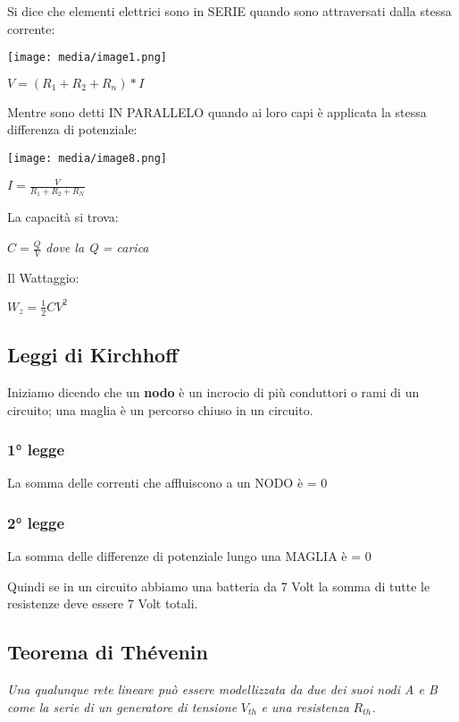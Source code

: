 Si dice che elementi elettrici sono in SERIE quando sono attraversati
dalla stessa corrente:

\texttt{[image: media/image1.png]}

\(V = (R_{1} + R_{2} + R_{n})*I\)

Mentre sono detti IN PARALLELO quando ai loro capi è applicata la stessa
differenza di potenziale:

\texttt{[image: media/image8.png]}

\(I = \frac{V}{R_{1} + R_{2} + R_{N}}\)

La capacità si trova:

\(C = \frac{Q}{V}\) \emph{dove la Q = carica}

Il Wattaggio:

\(W_{z} = \frac{1}{2}CV^{2}\)

\subsection{Leggi di Kirchhoff}\label{leggi-di-kirchhoff}

Iniziamo dicendo che un \textbf{nodo} è un incrocio di più conduttori o
rami di un circuito; una maglia è un percorso chiuso in un circuito.

\subsubsection{1° legge}\label{legge}

La somma delle correnti che affluiscono a un NODO è = 0

\subsubsection{2° legge}\label{legge-1}

La somma delle differenze di potenziale lungo una MAGLIA è = 0

Quindi se in un circuito abbiamo una batteria da 7 Volt la somma di
tutte le resistenze deve essere 7 Volt totali.

\subsection{Teorema di Thévenin}\label{teorema-di-thuxe9venin}

\emph{Una qualunque rete lineare può essere modellizzata da due dei suoi
nodi A e B come la serie di un generatore di tensione} \(V_{th}\)
\emph{e una resistenza} \(R_{th}\)\emph{.}

